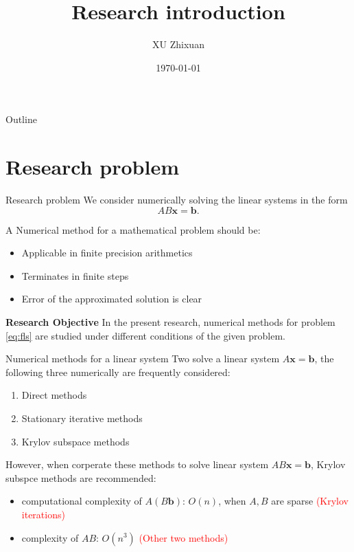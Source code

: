 \documentclass[aspectratio=169]{beamer}
\title{Research introduction}
\author{XU Zhixuan}
\date{\today}
\begin{document}
\begin{frame}
    \titlepage 
\end{frame}

\logo{}


\begin{frame}{Outline}
    \tableofcontents
\end{frame}


\section{Research problem}
\begin{frame}{Research problem}
	We consider numerically solving the linear systems in the form  
	\begin{equation}\label{eq:fls}
	AB \bm{x} = \bm{b}
	.
\end{equation}	
 

A Numerical method for a mathematical problem should be:
\begin{itemize}
	\item Applicable in finite precision arithmetics
	\item Terminates in finite steps
	\item Error of the approximated solution is clear 
\end{itemize}
\textbf{Research Objective}
In the present research, numerical methods for problem \eqref{eq:fls} are studied under different conditions of the given problem. 
\end{frame}

\begin{frame}{Numerical methods for a linear system}
	Two solve a linear system $A \bm{x} =\bm{b}$, the following three numerically are frequently considered:
	\begin{enumerate}
		\item Direct methods
		\item Stationary iterative methods
		\item Krylov subspace methods
	\end{enumerate}
	However, when corperate these methods to solve linear system $AB \bm{x} = \bm{b}$, Krylov subspce methods are recommended:
	\begin{itemize}
		\item computational complexity of  $A(B\bm{b})$: $O(n)$, when $A,B$ are sparse \textcolor{red}{ (Krylov iterations)}
		\item complexity of $AB$: $O(n^3)$ \textcolor{red}{ (Other two methods)}
	\end{itemize}
\end{frame}
\end{document}
